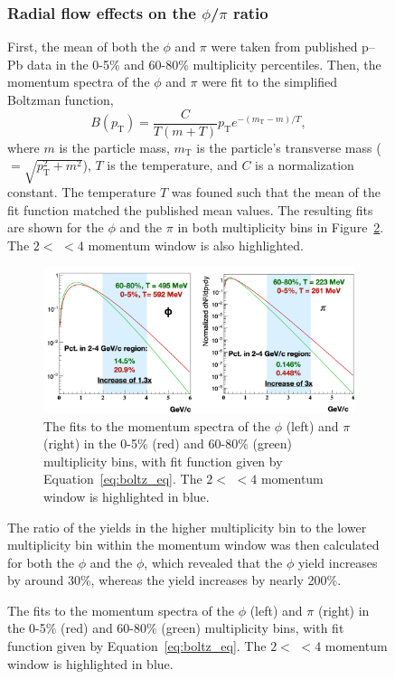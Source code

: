 \begin{figure}
    

\subsubsection{Radial flow effects on the $\phi$/$\pi$ ratio}

First, the mean \pt of both the $\phi$ and $\pi$ were taken from published p--Pb data in the 0-5\% and 60-80\% multiplicity percentiles. Then, the momentum spectra of the $\phi$ and $\pi$ were fit to the simplified Boltzman function,
%
\begin{equation}
    \label{eq:boltz_eq}
    B\left(p_{\mathrm{T}}\right)=\frac{C}{T(m+T)} p_{\mathrm{T}}e^{-\left(m_{\mathrm{T}}-m\right) / T },
\end{equation}
where $m$ is the particle mass, $m_{\text{T}}$ is the particle's transverse mass ($= \sqrt{p_{\mathrm{T}}^{2}+m^{2}}$), $T$ is the temperature, and $C$ is a normalization constant. The temperature $T$ was founed such that the mean \pt of the fit function matched the published mean \pt values. The resulting fits are shown for the $\phi$ and the $\pi$ in both multiplicity bins in Figure~\ref{fig:phi_pi_radial_flow}. The $2 <$ \pt $< 4$ \GeVc momentum window is also highlighted.

\begin{figure}[ht]
    \centering
    \includegraphics[width=\textwidth]{figures/analysis/phi_pi_radial_flow.png}
    \caption{The fits to the momentum spectra of the $\phi$ (left) and $\pi$ (right) in the 0-5\% (red) and 60-80\% (green) multiplicity bins, with fit function given by Equation~\ref{eq:boltz_eq}. The $2 <$ \pt $< 4$ \GeVc momentum window is highlighted in blue.}
    \label{fig:phi_pi_radial_flow}
\end{figure}

The ratio of the yields in the higher multiplicity bin to the lower multiplicity bin within the momentum window was then calculated for both the $\phi$ and the $\phi$, which revealed that the $\phi$ yield increases by around 30\%, whereas the \pi yield increases by nearly 200\%.




\end{figure}
